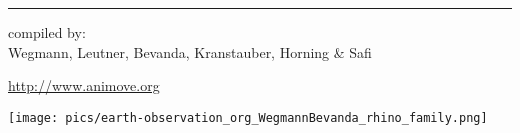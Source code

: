 \documentclass[a4paper,10pt,landscape]{article}
\begin{document}
\begin{multicols}{3}
\begin{tabular}{@{}p{\the\MyLen}%
                @{}p{\linewidth-\the\MyLen}@{}}
\end{tabular}




\scriptsize

\rule{0.32\textwidth}{0.4pt}

compiled by:\\ Wegmann, Leutner, Bevanda, Kranstauber, Horning \& Safi \\ \THEYEAR	

\url{http://www.animove.org}


\bigskip

\bigskip



\begin{center}
 \texttt{[image: pics/earth-observation\_org\_WegmannBevanda\_rhino\_family.png]}
\end{center}



\end{multicols}
\end{document}
